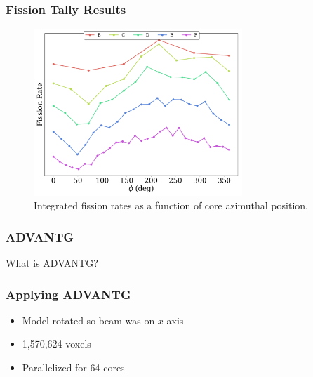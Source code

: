 \documentclass[fleqn]{beamer}
\begin{document}
\begin{frame}
\frametitle{Fission Tally Results}

\begin{figure}
\centering
\includegraphics[width = 0.7\textwidth]{totals_azi}
\caption{Integrated fission rates as a function of core azimuthal position.}
\end{figure}

\end{frame}

\begin{frame}
\frametitle{ADVANTG}

What is ADVANTG?

\end{frame}

\begin{frame}
\frametitle{Applying ADVANTG}

\begin{itemize}
\item Model rotated so beam was on $x$-axis
\item 1,570,624 voxels
\item Parallelized for 64 cores
\end{itemize}

\end{frame}
\end{document}

